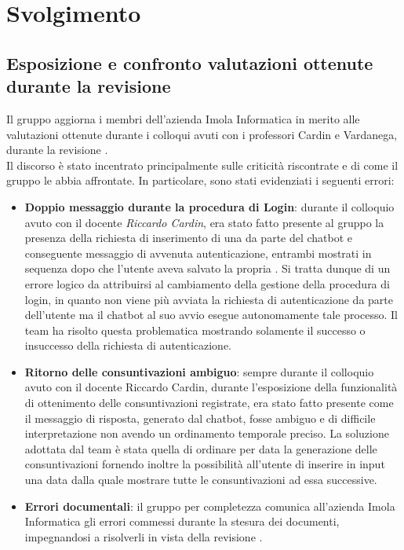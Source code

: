 \section{Svolgimento}
\subsection{Esposizione e confronto valutazioni ottenute durante la revisione }
Il gruppo aggiorna i membri dell'azienda Imola Informatica in merito alle valutazioni ottenute durante i colloqui avuti con i professori Cardin e Vardanega, durante la revisione . \\
Il discorso è stato incentrato principalmente sulle criticità riscontrate e di come il gruppo le abbia affrontate. In particolare, sono stati evidenziati i seguenti errori: 
\begin{itemize}
    \item \textbf{Doppio messaggio durante la procedura di Login}: durante il colloquio avuto con il docente \textit{Riccardo Cardin}, era stato fatto presente al gruppo la presenza della richiesta di inserimento di una  da parte del chatbot e conseguente messaggio di avvenuta autenticazione, entrambi mostrati in sequenza dopo che l'utente aveva salvato la propria . Si tratta dunque di un errore logico da attribuirsi al cambiamento della gestione della procedura di login, in quanto non viene più avviata la richiesta di autenticazione da parte dell'utente ma il chatbot al suo avvio esegue autonomamente tale processo. Il team ha risolto questa problematica mostrando solamente il successo o insuccesso della richiesta di autenticazione.
    \item \textbf{Ritorno delle consuntivazioni ambiguo}: sempre durante il colloquio avuto con il docente Riccardo Cardin, durante l'esposizione della funzionalità di ottenimento delle consuntivazioni registrate, era stato fatto presente come il messaggio di risposta, generato dal chatbot, fosse ambiguo e di difficile interpretazione non avendo un ordinamento temporale preciso. La soluzione adottata dal team è stata quella di ordinare per data la generazione delle consuntivazioni fornendo inoltre la possibilità all'utente di inserire in input una data dalla quale mostrare tutte le consuntivazioni ad essa successive. 
    \item \textbf{Errori documentali}: il gruppo per completezza comunica all'azienda Imola Informatica gli errori commessi durante la stesura dei documenti, impegnandosi a risolverli in vista della revisione .
\end{itemize}


